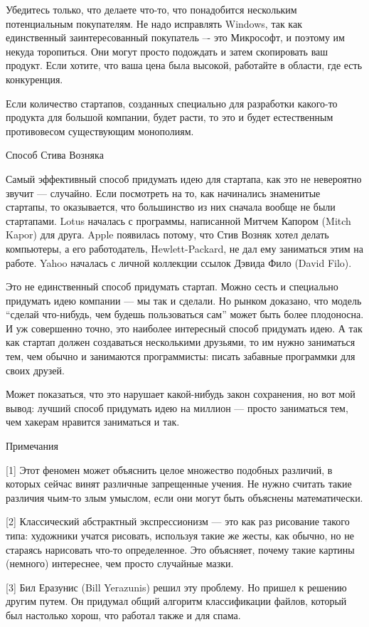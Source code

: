 \documentclass[ebook,12pt,oneside,openany]{memoir}
\begin{document}
Убедитесь только, что делаете что-то, что понадобится нескольким
потенциальным покупателям. Не надо исправлять Windows, так как
единственный заинтересованный покупатель –- это Микрософт, и поэтому
им некуда торопиться. Они могут просто подождать и затем скопировать
ваш продукт. Если хотите, что ваша цена была высокой, работайте в
области, где есть конкуренция.

Если количество стартапов, созданных специально для разработки
какого-то продукта для большой компании, будет расти, то это и будет
естественным противовесом существующим монополиям.

Способ Стива Возняка

Самый эффективный способ придумать идею для стартапа, как это не
невероятно звучит — случайно. Если посмотреть на то, как начинались
знаменитые стартапы, то оказывается, что большинство из них сначала
вообще не были стартапами. Lotus началась с программы, написанной
Митчем Капором (Mitch Kapor) для друга. Apple появилась потому, что
Стив Возняк хотел делать компьютеры, а его работодатель,
Hewlett-Packard, не дал ему заниматься этим на работе. Yahoo началась
с личной коллекции ссылок Дэвида Фило (David Filo).

Это не единственный способ придумать стартап. Можно сесть и специально
придумать идею компании — мы так и сделали. Но рынком доказано, что
модель “сделай что-нибудь, чем будешь пользоваться сам” может быть
более плодоносна. И уж совершенно точно, это наиболее интересный
способ придумать идею. А так как стартап должен создаваться
несколькими друзьями, то им нужно заниматься тем, чем обычно и
занимаются программисты: писать забавные программки для своих друзей.

Может показаться, что это нарушает какой-нибудь закон сохранения, но
вот мой вывод: лучший способ придумать идею на миллион — просто
заниматься тем, чем хакерам нравится заниматься и так.

Примечания

[1] Этот феномен может объяснить целое множество подобных различий, в
которых сейчас винят различные запрещенные учения. Не нужно считать
такие различия чьим-то злым умыслом, если они могут быть объяснены
математически.

[2] Классический абстрактный экспрессионизм — это как раз рисование
такого типа: художники учатся рисовать, используя такие же жесты, как
обычно, но не стараясь нарисовать что-то определенное. Это объясняет,
почему такие картины (немного) интереснее, чем просто случайные мазки.

[3] Бил Еразунис (Bill Yerazunis) решил эту проблему. Но пришел к
решению другим путем. Он придумал общий алгоритм классификации файлов,
который был настолько хорош, что работал также и для спама.
\end{document}
